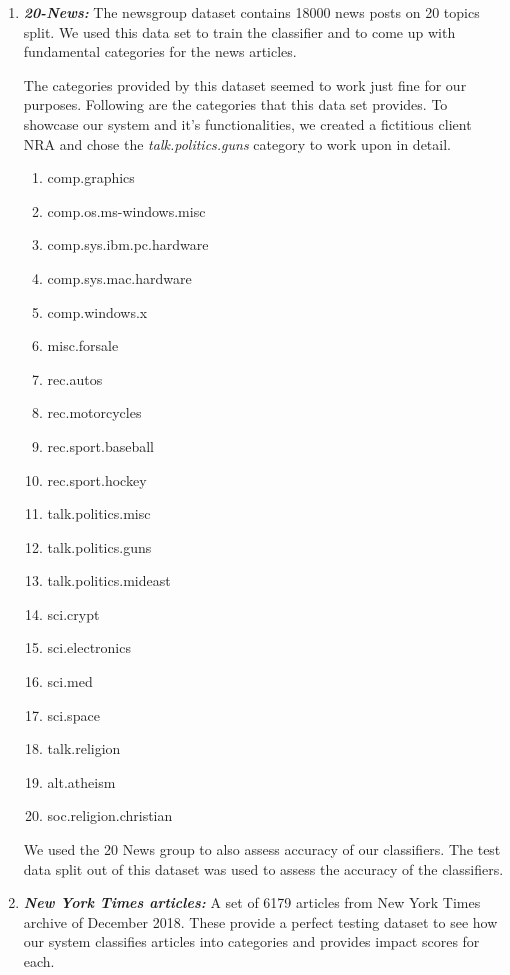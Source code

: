 \documentclass[paper=a4, fontsize=11pt]{scrartcl}
\numberwithin{equation}{section}		%
\numberwithin{figure}{section}			%
\numberwithin{table}{section}				%
\begin{document}
\begin {enumerate}

\item \textbf{\textit{20-News:} }
The newsgroup dataset contains 18000 news posts on 20 topics split. We used this data set to train the classifier and to come up with fundamental categories for the news articles.

The categories provided by this dataset seemed to work just fine for our purposes. Following are the categories that this data set provides. To showcase our system and it's functionalities, we created a fictitious client NRA and chose the \textit{talk.politics.guns} category to work upon in detail.

\begin {enumerate}
\item {comp.graphics}
\item {comp.os.ms-windows.misc}
\item {comp.sys.ibm.pc.hardware}
\item {comp.sys.mac.hardware}
\item {comp.windows.x}
\item {misc.forsale}
\item {rec.autos}
\item {rec.motorcycles}
\item {rec.sport.baseball}
\item {rec.sport.hockey}
\item {talk.politics.misc}
\item {talk.politics.guns}
\item { talk.politics.mideast}
\item {sci.crypt}
\item {sci.electronics}
\item {sci.med}
\item {sci.space}
\item {talk.religion}
\item {alt.atheism}
\item {soc.religion.christian}
\end {enumerate}

We used the 20 News group to also assess accuracy of our classifiers. The test data split out of this dataset was used to assess the accuracy of the classifiers.

\item \textbf{\textit{New York Times articles:}}
A set of 6179 articles from New York Times archive of December 2018. These provide a perfect testing dataset to see how our system classifies articles into categories and provides impact scores for each.

\end {enumerate}
\end{document}
